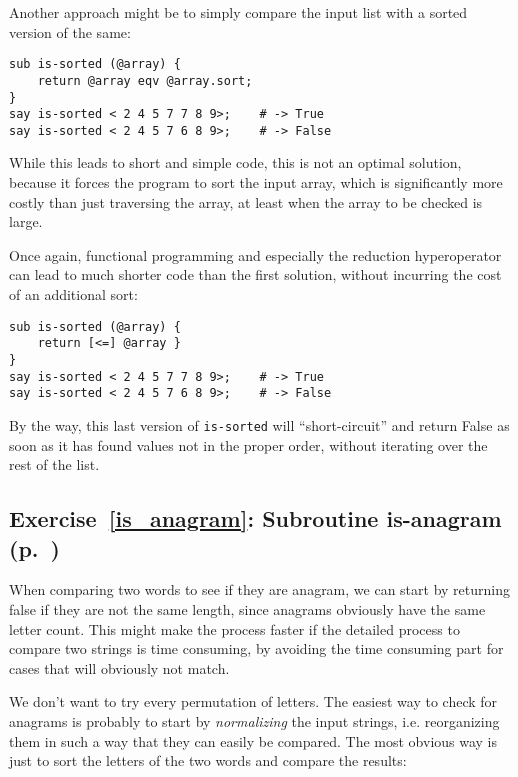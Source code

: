 Another approach might be to simply compare the input 
list with a sorted version of the same:

\begin{verbatim}
sub is-sorted (@array) {
    return @array eqv @array.sort;
}
say is-sorted < 2 4 5 7 7 8 9>;    # -> True
say is-sorted < 2 4 5 7 6 8 9>;    # -> False
\end{verbatim}

While this leads to short and simple code, this is not 
an optimal solution, because it forces the program to 
sort the input array, which is significantly more costly 
than just traversing the array, at least when the array 
to be checked is large.

Once again, functional programming and especially the 
reduction hyperoperator can lead to much shorter code 
than the first solution, without incurring the cost 
of an additional sort:

\begin{verbatim}
sub is-sorted (@array) {
    return [<=] @array }
}
say is-sorted < 2 4 5 7 7 8 9>;    # -> True
say is-sorted < 2 4 5 7 6 8 9>;    # -> False
\end{verbatim}

By the way, this last version of {\tt is-sorted} will 
``short-circuit'' and return False as soon as it has 
found values not in the proper order, without iterating 
over the rest of the list.

\subsection{Exercise~\ref{is_anagram}: Subroutine is-anagram (p.~\pageref{is_anagram})}
\label{sol_is_anagram}

When comparing two words to see if they are anagram, we 
can start by returning false if they are not the same 
length, since anagrams obviously have the same letter 
count. This might make the process faster if the detailed 
process to compare two strings is time consuming, by 
avoiding the time consuming part for cases that will 
obviously not match.

We don't want to try every permutation of letters. The 
easiest way to check for anagrams is probably to start 
by \emph{normalizing} the input strings, i.e. 
reorganizing them in such a way that they can easily 
be compared. The most obvious way is just to sort the 
letters of the two words and compare the results:

